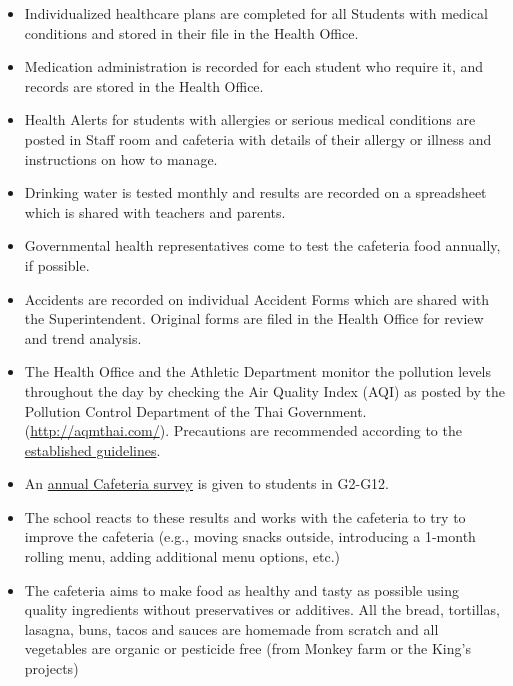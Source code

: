 \begin{itemize}
\item Individualized healthcare plans are completed for all Students with medical conditions and stored in their file in the Health Office.  
\item Medication administration is recorded for each student who require it, and records are stored in the Health Office.
\item Health Alerts for students with allergies or serious medical conditions are posted in Staff room and cafeteria with details of their allergy or illness and instructions on how to manage.
\end{itemize}


\begin{itemize}
\item Drinking water is tested monthly and results are recorded on a spreadsheet which is shared with teachers and parents.
\item Governmental health representatives come to test the cafeteria food annually, if possible.  
\item Accidents are recorded on individual Accident Forms which are shared with the Superintendent.  Original forms are filed in the Health Office for review and trend analysis.  
\item The Health Office and the Athletic Department monitor the pollution levels throughout the day by checking the Air Quality Index (AQI) as posted by the Pollution Control Department of the Thai Government. (\href{http://aqmthai.com/}{http://aqmthai.com/}).  Precautions are recommended according to the \href{https://docs.google.com/document/d/1RLrOBWjj_4ohMofL5RUIaWWwP66qTJ2NFEl_qY5U5Vw/edit?usp=sharing}{established guidelines}.  
\end{itemize}

\begin{itemize}
\item An \href{https://docs.google.com/spreadsheets/d/1Z2Wcw-UM1njZZ51OefDeCqH8mDTJvaefXS_WJbK4Z20/edit#gid=1328983646}{annual Cafeteria survey} is given to students in G2-G12. 
\item The school reacts to these results and works with the cafeteria to try to improve the cafeteria (e.g., moving snacks outside, introducing a 1-month rolling menu, adding additional menu options, etc.)
\item The cafeteria aims to make food as healthy and tasty as possible using quality ingredients without preservatives or additives. All the bread, tortillas, lasagna, buns, tacos and sauces are homemade from scratch and all vegetables are organic or pesticide free (from Monkey farm or the King’s projects)
\end{itemize}


